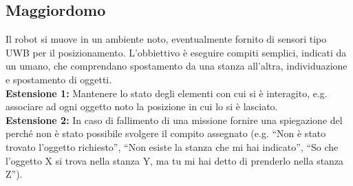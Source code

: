 \documentclass[a4paper]{article}
\begin{document}
	\subsection{Maggiordomo}\label{subsec:Maggiordomo}
	Il robot si muove in un ambiente noto, eventualmente fornito di sensori tipo UWB per il posizionamento. L'obbiettivo è eseguire compiti semplici, indicati da un umano, che comprendano spostamento da una stanza all'altra, individuazione e spostamento di oggetti.\\
	\textbf{Estensione 1:} Mantenere lo stato degli elementi con cui si è interagito, e.g. associare ad ogni oggetto noto la posizione in cui lo si è lasciato.\\
	\textbf{Estensione 2:} In caso di fallimento di una missione fornire una spiegazione del perché non è stato possibile svolgere il compito assegnato (e.g. ``Non è stato trovato l'oggetto richiesto'', ``Non esiste la stanza che mi hai indicato'', ``So che l'oggetto X si trova nella stanza Y, ma tu mi hai detto di prenderlo nella stanza Z'').

	
	
\end{document}
